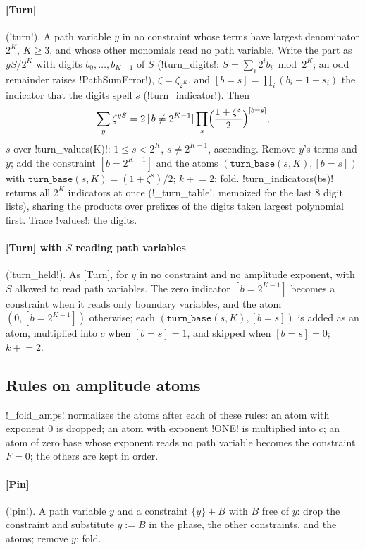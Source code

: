 \paragraph{[Turn]} (\code!turn!). A path variable $y$ in no constraint whose terms have largest denominator $2^K$, $K\ge3$, and whose other monomials read no path variable. Write the part as $yS/2^K$ with digits $b_0,\ldots,b_{K-1}$ of $S$ (\py!turn_digits!: $S=\sum_i2^ib_i\bmod2^K$; an odd remainder raises \py!PathSumError!), $\zeta=\zeta_{2^K}$, and $[b=s]=\prod_i(b_i+1+s_i)$ the indicator that the digits spell $s$ (\py!turn_indicator!). Then
\begin{equation}
\sum_y\zeta^{yS}=2\,[\,b\ne2^{K-1}]\prod_{s}\Bigl(\frac{1+\zeta^s}{2}\Bigr)^{[b=s]},
\end{equation}
$s$ over \py!turn_values(K)!: $1\le s<2^K$, $s\ne2^{K-1}$, ascending. Remove $y$'s terms and $y$; add the constraint $[b=2^{K-1}]$ and the atoms $(\mathtt{turn\_base}(s,K),[b=s])$ with $\mathtt{turn\_base}(s,K)=(1+\zeta^s)/2$; $k\mathrel{+}=2$; fold. \py!turn_indicators(bs)! returns all $2^K$ indicators at once (\py!_turn_table!, memoized for the last 8 digit lists), sharing the products over prefixes of the digits taken largest polynomial first. Trace \code!values!: the digits.

\paragraph{[Turn] with $S$ reading path variables} (\code!turn_held!). As [Turn], for $y$ in no constraint and no amplitude exponent, with $S$ allowed to read path variables. The zero indicator $[b=2^{K-1}]$ becomes a constraint when it reads only boundary variables, and the atom $(0,[b=2^{K-1}])$ otherwise; each $(\mathtt{turn\_base}(s,K),[b=s])$ is added as an atom, multiplied into $c$ when $[b=s]=1$, and skipped when $[b=s]=0$; $k\mathrel{+}=2$.

\subsection{Rules on amplitude atoms}

\py!_fold_amps! normalizes the atoms after each of these rules: an atom with exponent $0$ is dropped; an atom with exponent \py!ONE! is multiplied into $c$; an atom of zero base whose exponent reads no path variable becomes the constraint $F=0$; the others are kept in order.

\paragraph{[Pin]} (\code!pin!). A path variable $y$ and a constraint $\{y\}+B$ with $B$ free of $y$: drop the constraint and substitute $y:=B$ in the phase, the other constraints, and the atoms; remove $y$; fold.

